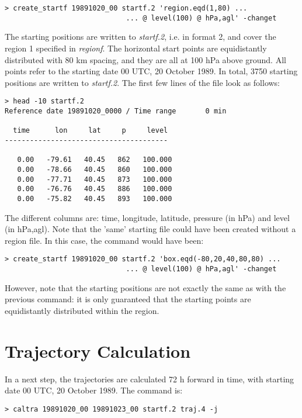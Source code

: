 \documentclass[a4paper,10pt]{article}
\begin{document}
\begin{verbatim}
> create_startf 19891020_00 startf.2 'region.eqd(1,80) ...
                             ... @ level(100) @ hPa,agl' -changet
\end{verbatim}

\noindent
The starting positions are written to {\em startf.2}, i.e. in format 2, and cover the region 1 specified in {\em regionf}. The horizontal start points are equidistantly distributed with 80 km spacing, and they are all at 100 hPa above ground. All points refer to the starting date 00 UTC, 20 October 1989.
In total, 3750 starting positions are written to {\em startf.2}. The first few lines of the file look as follows:

\begin{verbatim}
> head -10 startf.2
Reference date 19891020_0000 / Time range       0 min

  time      lon     lat     p     level
---------------------------------------

   0.00   -79.61   40.45   862   100.000
   0.00   -78.66   40.45   860   100.000
   0.00   -77.71   40.45   873   100.000
   0.00   -76.76   40.45   886   100.000
   0.00   -75.82   40.45   893   100.000
\end{verbatim}

\noindent
The different columns are: time, longitude, latitude, pressure (in hPa) and level (in hPa,agl). Note that the 'same' starting file could have been created without a region file. In this case, the command would have been:

\begin{verbatim}
> create_startf 19891020_00 startf.2 'box.eqd(-80,20,40,80,80) ...
                             ... @ level(100) @ hPa,agl' -changet
\end{verbatim}

\noindent
However, note that the starting positions are not exactly the same as with the previous command: it is only guaranteed that the starting points are equidistantly distributed within the region.


\section{Trajectory Calculation}

In a next step, the trajectories are calculated 72 h forward in time, with starting date 00 UTC, 20 October 1989. The command is:

\begin{verbatim}
> caltra 19891020_00 19891023_00 startf.2 traj.4 -j
\end{verbatim}
\end{document}
